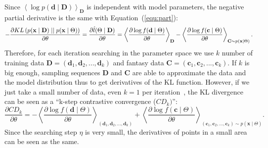 	Since $\left \langle \log p(\mathbf{d} \mid \mathbf{D}) \right \rangle_{\mathbf{D}}$ is independent with model parameters, the negative partial derivative is the same with Equation~(\ref{equ:part}):
	\begin{equation}
	\label{equ:kl}
		-\dfrac{\partial KL \left( p(\mathbf{x} \mid \mathbf{D}) \mid \mid p(\mathbf{x} \mid \Theta) \right)}{\partial \theta}
		= \dfrac{\partial \hat{l} (\Theta \mid \mathbf{D})}{\partial \theta} \\
		= \left \langle \dfrac{\partial \log f(\mathbf{d} \mid \Theta)}{\partial \theta}\right \rangle_{\mathbf{D}} - \left \langle \dfrac{\partial \log f(\mathbf{c} \mid \Theta)}{\partial \theta}\right \rangle_{\mathbf{C} \sim p(\mathbf{x} \mid \Theta)} .
	\end{equation}
	Therefore, for each iteration searching in the parameter space we use $ k $ number of training data $ \mathbf{D}=(\mathbf{d}_1, \mathbf{d}_2, ..., \mathbf{d}_k) $ and fantasy data $ \mathbf{C}=(\mathbf{c}_1, \mathbf{c}_2, ..., \mathbf{c}_k) $.
	If $ k $ is big enough, sampling sequences $ \mathbf{D} $ and $ \mathbf{C} $ are able to approximate the data and the model distribution thus to get derivatives of the KL function.
	However, if we just take a small number of data, even $ k = 1 $ per iteration~\cite{hinton2002training}, the KL divergence can be seen as a ``k-step contrastive convergence ($ CD_{k}) $'':
	\begin{equation}
	\label{equ:cdk}
		\dfrac{\partial CD_{k}}{\partial \theta} 
		= - \left \langle \dfrac{\partial \log f(\mathbf{d} \mid \Theta)}{\partial \theta}\right \rangle_{(\mathbf{d}_1, \mathbf{d}_2, ..., \mathbf{d}_k) } + \left \langle \dfrac{\partial \log f(\mathbf{c} \mid \Theta)}{\partial \theta}\right \rangle_{(\mathbf{c}_1, \mathbf{c}_2, ..., \mathbf{c}_k) \sim p(\mathbf{x} \mid \Theta)}.
	\end{equation}
	Since the searching step $ \eta $ is very small, the derivatives of points in a small area can be seen as the same.
	
